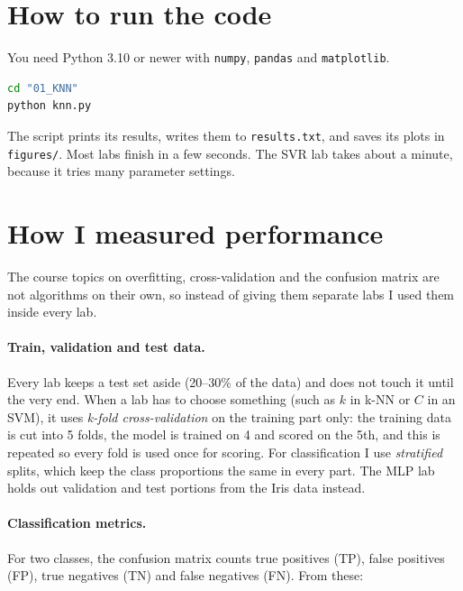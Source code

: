 \section*{How to run the code}
You need Python 3.10 or newer with \texttt{numpy}, \texttt{pandas} and \texttt{matplotlib}.

\begin{lstlisting}[language=bash, numbers=none, frame=none, xleftmargin=10pt]
cd "01_KNN"
python knn.py
\end{lstlisting}

The script prints its results, writes them to \texttt{results.txt}, and saves its plots in
\texttt{figures/}. Most labs finish in a few seconds. The SVR lab takes about a minute, because it tries many
parameter settings.

\section*{How I measured performance}
The course topics on overfitting, cross-validation and the confusion matrix are not algorithms on their
own, so instead of giving them separate labs I used them inside every lab.

\paragraph{Train, validation and test data.} Every lab keeps a test set aside (20--30\% of the data) and
does not touch it until the very end. When a lab has to choose something (such as $k$ in k-NN or $C$
in an SVM), it uses \emph{k-fold cross-validation} on the training part only: the training data is cut
into 5 folds, the model is trained on 4 and scored on the 5th, and this is repeated so every fold is used
once for scoring. For classification I use \emph{stratified} splits, which keep the class proportions the
same in every part. The MLP lab holds out validation and test portions from the Iris data instead.

\paragraph{Classification metrics.} For two classes, the confusion matrix counts true positives (TP),
false positives (FP), true negatives (TN) and false negatives (FN). From these:

